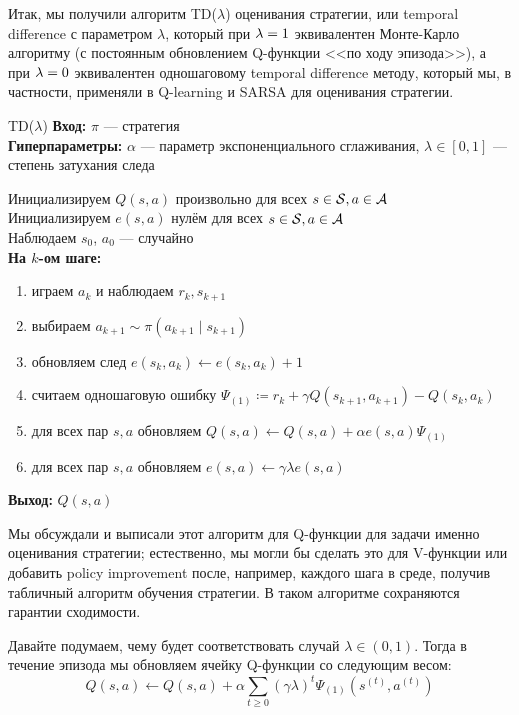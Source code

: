 Итак, мы получили алгоритм TD($\lambda$) оценивания стратегии, или temporal difference с параметром $\lambda$, который при $\lambda \HM= 1$ эквивалентен Монте-Карло алгоритму (с постоянным обновлением Q-функции <<по ходу эпизода>>), а при $\lambda \HM = 0$ эквивалентен одношаговому temporal difference методу, который мы, в частности, применяли в Q-learning и SARSA для оценивания стратегии.

\begin{algorithm}{TD($\lambda$)}
\textbf{Вход:} $\pi$ --- стратегия \\
\textbf{Гиперпараметры:} $\alpha$ --- параметр экспоненциального сглаживания, $\lambda \in [0, 1]$ --- степень затухания следа

\vspace{0.3cm}
Инициализируем $Q(s, a)$ произвольно для всех $s \in \mathcal{S}, a \in \mathcal{A}$ \\
Инициализируем $e(s, a)$ нулём для всех $s \in \mathcal{S}, a \in \mathcal{A}$ \\
Наблюдаем $s_0$, $a_0$ --- случайно \\
\textbf{На $k$-ом шаге:}
\begin{enumerate}
    \item играем $a_k$ и наблюдаем $r_k, s_{k+1}$
    \item выбираем $a_{k+1} \sim \pi(a_{k+1} \mid s_{k+1})$
    \item обновляем след $e(s_k, a_k) \leftarrow e(s_k, a_k) + 1$
    \item считаем одношаговую ошибку $\Psi_{(1)} \coloneqq r_k + \gamma Q(s_{k+1}, a_{k+1}) - Q(s_k, a_k)$
    \item для всех пар $s, a$ обновляем $Q(s, a) \leftarrow Q(s, a) + \alpha e(s, a) \Psi_{(1)}$
    \item для всех пар $s, a$ обновляем $e(s, a) \leftarrow \gamma \lambda e(s, a)$
\end{enumerate}

\vspace{0.3cm}
\textbf{Выход:} $Q(s, a)$
\end{algorithm}

Мы обсуждали и выписали этот алгоритм для Q-функции для задачи именно оценивания стратегии; естественно, мы могли бы сделать это для V-функции или добавить policy improvement после, например, каждого шага в среде, получив табличный алгоритм обучения стратегии. В таком алгоритме сохраняются гарантии сходимости.

Давайте подумаем, чему будет соответствовать случай $\lambda \in (0, 1)$. Тогда в течение эпизода мы обновляем ячейку Q-функции со следующим весом:
$$Q(s, a) \leftarrow Q(s, a) + \alpha \sum_{t \ge 0} (\gamma \lambda)^t \Psi_{(1)}(s^{(t)}, a^{(t)})$$

